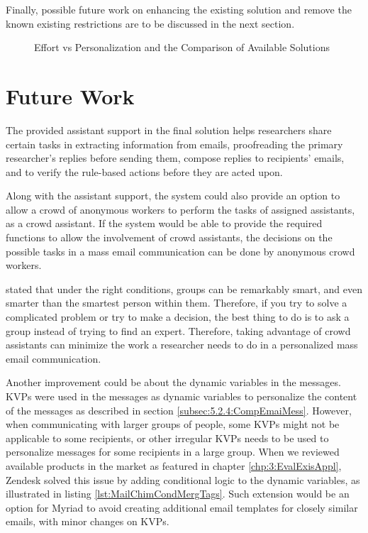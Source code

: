 Finally, possible future work on enhancing the existing solution and remove the known existing restrictions are to be discussed in the next section.

\begin{figure}[htbp]
	\centering
	\begin{pdfpic}
	    
	\end{pdfpic}
	\caption[Effort vs Personalization and the Comparison of Available Solutions]{Effort vs Personalization and the Comparison of Available Solutions}
	\label{fig:drawingEfforPersonalizationAnnotations}
\end{figure}

\section{Future Work}
\label{sec:6.2:FutuWork}

The provided assistant support in the final solution helps researchers share certain tasks in extracting information from emails, proofreading the primary researcher's replies before sending them, compose replies to recipients' emails, and to verify the rule-based actions before they are acted upon.
\vspace{1cm}

Along with the assistant support, the system could also provide an option to allow a crowd of anonymous workers to perform the tasks of assigned assistants, as a crowd assistant. If the system would be able to provide the required functions to allow the involvement of crowd assistants, the decisions on the possible tasks in a mass email communication can be done by anonymous crowd workers.
\vspace{1cm}

\cite{Surowiecki2005} stated that under the right conditions, groups can be remarkably smart, and even smarter than the smartest person within them. Therefore, if you try to solve a complicated problem or try to make a decision, the best thing to do is to ask a group instead of trying to find an expert. Therefore, taking advantage of crowd assistants can minimize the work a researcher needs to do in a personalized mass email communication.
\vspace{1cm}

Another improvement could be about the dynamic variables in the messages. \ac{KVP}s were used in the messages as dynamic variables to personalize the content of the messages as described in section \ref{subsec:5.2.4:CompEmaiMess}. However, when communicating with larger groups of people, some \ac{KVP}s might not be applicable to some recipients, or other irregular \ac{KVP}s needs to be used to personalize messages for some recipients in a large group. When we reviewed available products in the market as featured in chapter \ref{chp:3:EvalExisAppl}, Zendesk solved this issue by adding conditional logic to the dynamic variables, as illustrated in listing \ref{lst:MailChimCondMergTags}. Such extension would be an option for Myriad to avoid creating additional email templates for closely similar emails, with minor changes on \ac{KVP}s.
\vspace{1cm}

